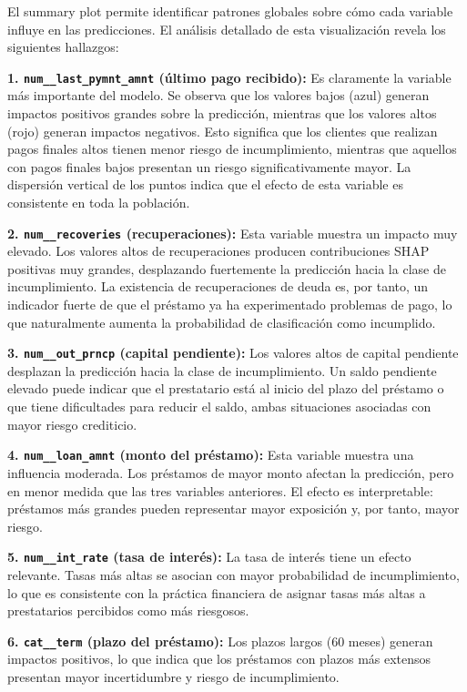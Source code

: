 \documentclass[12pt,a4paper]{article}
\begin{document}
El summary plot permite identificar patrones globales sobre cómo cada variable influye en las predicciones. El análisis detallado de esta visualización revela los siguientes hallazgos:

\textbf{1. \texttt{num\_\_last\_pymnt\_amnt} (último pago recibido):} Es claramente la variable más importante del modelo. Se observa que los valores bajos (azul) generan impactos positivos grandes sobre la predicción, mientras que los valores altos (rojo) generan impactos negativos. Esto significa que los clientes que realizan pagos finales altos tienen menor riesgo de incumplimiento, mientras que aquellos con pagos finales bajos presentan un riesgo significativamente mayor. La dispersión vertical de los puntos indica que el efecto de esta variable es consistente en toda la población.

\textbf{2. \texttt{num\_\_recoveries} (recuperaciones):} Esta variable muestra un impacto muy elevado. Los valores altos de recuperaciones producen contribuciones SHAP positivas muy grandes, desplazando fuertemente la predicción hacia la clase de incumplimiento. La existencia de recuperaciones de deuda es, por tanto, un indicador fuerte de que el préstamo ya ha experimentado problemas de pago, lo que naturalmente aumenta la probabilidad de clasificación como incumplido.

\textbf{3. \texttt{num\_\_out\_prncp} (capital pendiente):} Los valores altos de capital pendiente desplazan la predicción hacia la clase de incumplimiento. Un saldo pendiente elevado puede indicar que el prestatario está al inicio del plazo del préstamo o que tiene dificultades para reducir el saldo, ambas situaciones asociadas con mayor riesgo crediticio.

\textbf{4. \texttt{num\_\_loan\_amnt} (monto del préstamo):} Esta variable muestra una influencia moderada. Los préstamos de mayor monto afectan la predicción, pero en menor medida que las tres variables anteriores. El efecto es interpretable: préstamos más grandes pueden representar mayor exposición y, por tanto, mayor riesgo.

\textbf{5. \texttt{num\_\_int\_rate} (tasa de interés):} La tasa de interés tiene un efecto relevante. Tasas más altas se asocian con mayor probabilidad de incumplimiento, lo que es consistente con la práctica financiera de asignar tasas más altas a prestatarios percibidos como más riesgosos.

\textbf{6. \texttt{cat\_\_term} (plazo del préstamo):} Los plazos largos (60 meses) generan impactos positivos, lo que indica que los préstamos con plazos más extensos presentan mayor incertidumbre y riesgo de incumplimiento.
\end{document}
